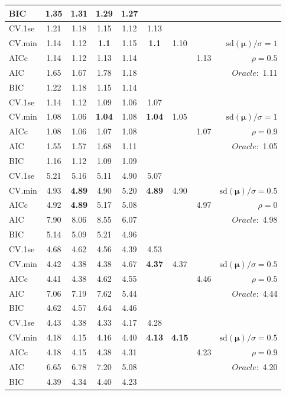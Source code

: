 \begin{table}
\begin{center}
\begin{tabular}{l*{7}{c}|r}
BIC & 1.35 & 1.31 & 1.29 & 1.27 & & & &  \\
 \hline 
CV.1se & 1.21 & 1.18 & 1.15 & 1.12 & 1.13 & & & \\
CV.min & 1.14 & 1.12 & {\bf 1.1} & 1.15 & {\bf 1.1} & 1.10 & & $\mathrm{sd}(\mathbf{\mu})/\sigma=1$ \\
AICc & 1.14 & 1.12 & 1.13 & 1.14 & & & 1.13 &  $\rho=0.5$ \\
AIC & 1.65 & 1.67 & 1.78 & 1.18 & & & &  \multirow{2}{*}{$Oracle: $ 1.11} \\
BIC & 1.22 & 1.18 & 1.15 & 1.14 & & & &  \\
 \hline 
CV.1se & 1.14 & 1.12 & 1.09 & 1.06 & 1.07 & & & \\
CV.min & 1.08 & 1.06 & {\bf 1.04} & 1.08 & {\bf 1.04} & 1.05 & & $\mathrm{sd}(\mathbf{\mu})/\sigma=1$ \\
AICc & 1.08 & 1.06 & 1.07 & 1.08 & & & 1.07 &  $\rho=0.9$ \\
AIC & 1.55 & 1.57 & 1.68 & 1.11 & & & &  \multirow{2}{*}{$Oracle: $ 1.05} \\
BIC & 1.16 & 1.12 & 1.09 & 1.09 & & & &  \\
 \hline 
CV.1se & 5.21 & 5.16 & 5.11 & 4.90 & 5.07 & & & \\
CV.min & 4.93 & {\bf 4.89} & 4.90 & 5.20 & {\bf 4.89} & 4.90 & & $\mathrm{sd}(\mathbf{\mu})/\sigma=0.5$ \\
AICc & 4.92 & {\bf 4.89} & 5.17 & 5.08 & & & 4.97 &  $\rho=0$ \\
AIC & 7.90 & 8.06 & 8.55 & 6.07 & & & &  \multirow{2}{*}{$Oracle: $ 4.98} \\
BIC & 5.14 & 5.09 & 5.21 & 4.96 & & & &  \\
 \hline 
CV.1se & 4.68 & 4.62 & 4.56 & 4.39 & 4.53 & & & \\
CV.min & 4.42 & 4.38 & 4.38 & 4.67 & {\bf 4.37} & 4.37 & & $\mathrm{sd}(\mathbf{\mu})/\sigma=0.5$ \\
AICc & 4.41 & 4.38 & 4.62 & 4.55 & & & 4.46 &  $\rho=0.5$ \\
AIC & 7.06 & 7.19 & 7.62 & 5.44 & & & &  \multirow{2}{*}{$Oracle: $ 4.44} \\
BIC & 4.62 & 4.57 & 4.64 & 4.46 & & & &  \\
 \hline 
CV.1se & 4.43 & 4.38 & 4.33 & 4.17 & 4.28 & & & \\
CV.min & 4.18 & 4.15 & 4.16 & 4.40 & {\bf 4.13} & {\bf 4.15} & & $\mathrm{sd}(\mathbf{\mu})/\sigma=0.5$ \\
AICc & 4.18 & 4.15 & 4.38 & 4.31 & & & 4.23 &  $\rho=0.9$ \\
AIC & 6.65 & 6.78 & 7.20 & 5.08 & & & &  \multirow{2}{*}{$Oracle: $ 4.20} \\
BIC & 4.39 & 4.34 & 4.40 & 4.23 & & & &  \\
 \hline 
\end{tabular}
\end{center}
\vspace{-1cm}
\end{table}




